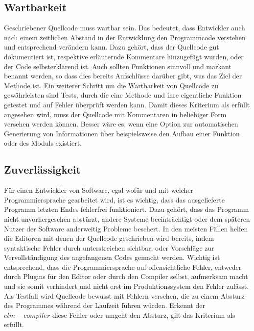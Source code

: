 \subsection{Wartbarkeit}
\label{sec:Wartbarkeit}
Geschriebener Quellcode muss wartbar sein. Das bedeutet, dass Entwickler auch nach einem zeitlichen Abstand in der Entwicklung den Programmcode verstehen und entsprechend verändern kann. Dazu gehört, dass der Quellcode gut dokumentiert ist, respektive erläuternde Kommentare hinzugefügt wurden, oder der Code selbsterklärend ist. Auch sollten Funktionen sinnvoll und markant benannt werden, so dass dies bereits Aufschlüsse darüber gibt, was das Ziel der Methode ist. Ein weiterer Schritt um die Wartbarkeit von Quellcode zu gewährleisten sind Tests, durch die eine Methode und ihre eigentliche Funktion getestet und auf Fehler überprüft werden kann. Damit dieses Kriterium als erfüllt angesehen wird, muss der Quellcode mit Kommentaren in beliebiger Form versehen werden können. Besser wäre es, wenn eine Option zur automatischen Generierung von Informationen über beispielsweise den Aufbau einer Funktion oder des Moduls existiert.

\subsection{Zuverlässigkeit}
\label{sec:Zuverlässigkeit}
Für einen Entwickler von Software, egal wofür und mit welcher Programmiersprache gearbeitet wird, ist es wichtig, dass das ausgelieferte Programm letzten Endes fehlerfrei funktioniert. Dazu gehört, dass das Programm nicht unvorhergesehen abstürzt, andere Systeme beeinträchtigt oder dem späteren Nutzer der Software anderweitig Probleme beschert. In den meisten Fällen helfen die Editoren mit denen der Quellcode geschrieben wird bereits, indem syntaktische Fehler durch unterstreichen sichtbar, oder Vorschläge zur Vervollständigung des angefangenen Codes gemacht werden. Wichtig ist entsprechend, dass die Programmiersprache auf offensichtliche Fehler, entweder durch Plugins für den Editor oder durch den Compiler selbst, aufmerksam macht und sie somit verhindert und nicht erst im Produktionssystem den Fehler zulässt. Als Testfall wird Quellcode bewusst mit Fehlern versehen, die zu einem Absturz des Programmes während der Laufzeit führen würden. Erkennt der $elm-compiler$ diese Fehler oder umgeht den Absturz, gilt das Kriterium als erfüllt.


